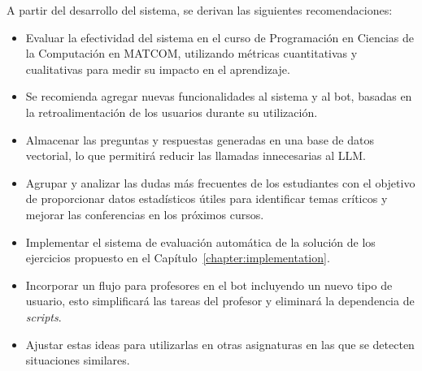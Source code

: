 \begin{recomendations}
    A partir del desarrollo del sistema, se derivan las siguientes recomendaciones:

    \begin{itemize}
        \item Evaluar la efectividad del sistema en el curso de Programación en Ciencias de la Computación en \mbox{MATCOM}, utilizando métricas cuantitativas y cualitativas para medir su impacto en el aprendizaje.
        
        \item Se recomienda agregar nuevas funcionalidades al sistema y al bot, basadas en la retroalimentación de los usuarios durante su utilización.
        
        \item Almacenar las preguntas y respuestas generadas en una base de datos vectorial, lo que permitirá reducir las llamadas innecesarias al LLM.
    
        \item Agrupar y analizar las dudas más frecuentes de los estudiantes con el objetivo de proporcionar datos estadísticos útiles para identificar temas críticos y mejorar las conferencias en los próximos cursos.
        
        \item Implementar el sistema de evaluación automática de la solución de los ejercicios propuesto en el Capítulo~\ref{chapter:implementation}.
        
        \item Incorporar un flujo para profesores en el bot incluyendo un nuevo tipo de usuario, esto simplificará las tareas del profesor y eliminará la dependencia de \textit{scripts}.
        
        \item Ajustar estas ideas para utilizarlas en otras asignaturas en las que se detecten
        situaciones similares.
    \end{itemize}
\end{recomendations}
